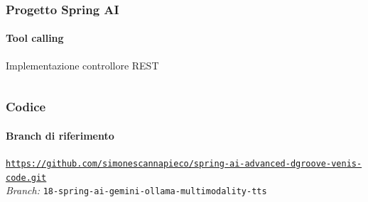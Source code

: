 %
\begin{frame}[t,fragile] \frametitle{Progetto Spring AI}
    \framesubtitle{Tool calling}
    	\vspace*{-.7cm}
        \begin{block}{Implementazione controllore REST}
			{\tiny\inputminted{java}{code/GeminiMultimodalityController.java}}
    	\end{block}
\end{frame}
%
\begin{frame}[fragile] \frametitle{Codice}
    \framesubtitle{Branch di riferimento}
	\begin{center}
		{\scriptsize \href{https://github.com/simonescannapieco/spring-ai-advanced-dgroove-venis-code.git}{\texttt{https://github.com/simonescannapieco/spring-ai-advanced-dgroove-venis-code.git}}}\\
		\textit{Branch:} \alert{\texttt{18-spring-ai-gemini-ollama-multimodality-tts}}
	\end{center}
\end{frame}